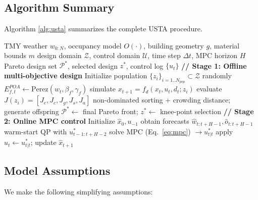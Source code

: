 \documentclass[preprint,12pt]{elsarticle}
\begin{document}
\subsection{Algorithm Summary}

Algorithm \ref{alg:usta} summarizes the complete USTA procedure.

\begin{algorithm}[htbp]
\caption{USTA Hierarchical Design-Control Pipeline}
\label{alg:usta}
\begin{algorithmic}[1]
\REQUIRE TMY weather $w_{0:N}$, occupancy model $O(\cdot)$, building geometry $g$, material bounds $m$
\REQUIRE design domain $\mathcal{Z}$, control domain $\mathcal{U}$, time step $\Delta t$, MPC horizon $H$
\ENSURE Pareto design set $\mathcal{P}^*$, selected design $z^*$, control log $\{u_t\}$
\STATE \textbf{// Stage 1: Offline multi-objective design}
\STATE Initialize population $\{z_i\}_{i=1..N_{pop}} \subset \mathcal{Z}$ randomly
        \STATE $E^{POA}_{f,t} \leftarrow \text{Perez}(w_t, \beta_f, \gamma_f)$ 
        \STATE simulate $x_{t+1} = f_d(x_t, u_t, d_t; z_i)$ 
        \STATE evaluate $J(z_i) = [J_e, J_c, J_g, J_s, J_a]$ 
    \ENDFOR
    \STATE non-dominated sorting + crowding distance; generate offspring
\ENDFOR
\STATE $\mathcal{P}^* \leftarrow$ final Pareto front; $z^* \leftarrow$ knee-point selection
\STATE \textbf{// Stage 2: Online MPC control}
\STATE Initialize $\hat{x}_0, u_{-1}$
    \STATE obtain forecasts $\hat{w}_{t:t+H-1}, \hat{o}_{t:t+H-1}$
    \STATE warm-start QP with $u^*_{t-1:t+H-2}$
    \STATE solve MPC (Eq.~\eqref{eq:mpc}) $\rightarrow u^*_{t|t}$
    \STATE apply $u_t \leftarrow u^*_{t|t}$; update $\hat{x}_{t+1}$
\ENDFOR
\end{algorithmic}
\end{algorithm}

\subsection{Model Assumptions}

We make the following simplifying assumptions:
\end{document}
